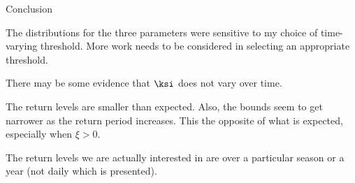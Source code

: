 \documentclass[mathserif, 11pt, t]{beamer}
\begin{document}
\begin{frame}{Conclusion}

The distributions for the three parameters were sensitive to my choice of time-varying threshold. More work needs to be considered in selecting an appropriate threshold.
\bigskip

There may be some evidence that $\ksi$ does not vary over time.
\bigskip

The return levels are smaller than expected. Also, the bounds seem to get narrower as the return period increases. This the opposite of what is expected, especially when $\xi>0$.
\bigskip

The return levels we are actually interested in are over a particular season or a year (not daily which is presented).
\bigskip



\end{frame}
\end{document}
